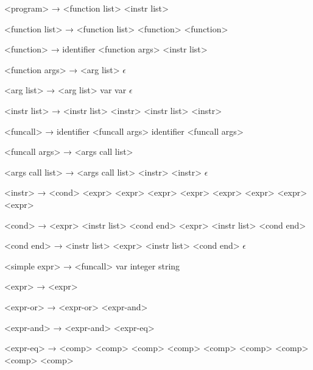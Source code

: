 ﻿<program>        →  <function list> <instr list>

<function list>  → <function list> <function>
                 \alt <function>

<function>       →  identifier <function args>
                   \lit{\{} <instr list> \lit{\}}

<function args>  → \lit{(} <arg list> \lit{)}
                 \alt $\epsilon$

<arg list>       → <arg list> \lit{,} var
                 \alt var
                 \alt $\epsilon$

<instr list>     → <instr list> <instr> \lit{;}
                 \alt \lit{\{} <instr list> \lit{\}}
                 \alt <instr> \lit{;}

<funcall>        → \lit{\&} identifier <funcall args> 
                 \alt identifier <funcall args> 

<funcall args>   → \lit{(} <args call list> \lit{)}

<args call list> → <args call list> \lit{,} <instr>
                 \alt <instr>
                 \alt $\epsilon$

<instr>          → <cond>
                 \alt <expr>
                 \alt <expr> \lit{=} <expr>
                 \alt <expr>  <expr>
                 \alt <expr>  <expr>
                 \alt {} <expr>

<cond>           →  <expr> \lit{\{} <instr list> \lit{\}} <cond end>
                 \alt {} <expr> \lit{\{} <instr list> \lit{\}} <cond end>

<cond end>       →  \lit{\{} <instr list> \lit{\}}
                 \alt {} <expr> \lit{\{} <instr list> \lit{\}} <cond end>
                 \alt $\epsilon$

<simple expr>    → <funcall>
                 \alt var
                 \alt integer
                 \alt string

<expr>           →  <expr>

<expr-or>        → <expr-or> \lit{||} <expr-and>

<expr-and>       → <expr-and> \lit{\&\&} <expr-eq>

<expr-eq>        → <comp> \lit{==} <comp>
                 \alt <comp> \lit{!=} <comp>
                 \alt <comp>  <comp>
                 \alt <comp>  <comp>
                 \alt <comp>

